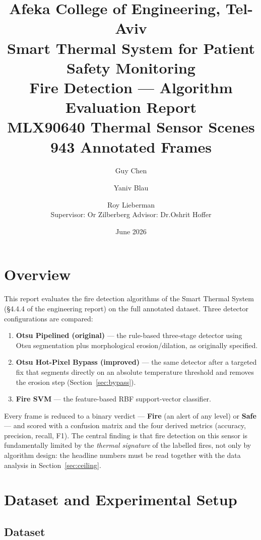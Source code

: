 \documentclass[11pt, a4paper]{article}
\title{%
    {\large Afeka College of Engineering, Tel-Aviv}\\[0.4em]
    {\large Smart Thermal System for Patient Safety Monitoring}\\[0.8em]
    {\LARGE\bfseries Fire Detection — Algorithm Evaluation Report}\\[0.4em]
    {\normalsize MLX90640 Thermal Sensor \quad 22 Scenes \quad
     5{,}943 Annotated Frames}
}
\author{%
    Guy Chen \and Yaniv Blau \and Roy Lieberman\\[0.3em]
    \small Supervisor: Or Zilberberg \qquad Advisor: Dr.\@ Oshrit Hoffer
}
\date{June 2026}
\begin{document}
\maketitle
\tableofcontents
\newpage

\section{Overview}

This report evaluates the fire detection algorithms of the Smart Thermal System
(\S4.4.4 of the engineering report) on the full annotated dataset.  Three detector
configurations are compared:

\begin{enumerate}[leftmargin=2em]
    \item \textbf{Otsu Pipelined (original)} — the rule-based three-stage detector
          using Otsu segmentation plus morphological erosion/dilation, as originally
          specified.
    \item \textbf{Otsu Hot-Pixel Bypass (improved)} — the same detector after a
          targeted fix that segments directly on an absolute temperature threshold and
          removes the erosion step (Section~\ref{sec:bypass}).
    \item \textbf{Fire SVM} — the feature-based RBF support-vector classifier.
\end{enumerate}

Every frame is reduced to a binary verdict — \textbf{Fire} (an alert of any level)
or \textbf{Safe} — and scored with a confusion matrix and the four derived metrics
(accuracy, precision, recall, F1).  The central finding is that fire detection on this
sensor is fundamentally limited by the \emph{thermal signature} of the labelled fires,
not only by algorithm design: the headline numbers must be read together with the
data analysis in Section~\ref{sec:ceiling}.

\section{Dataset and Experimental Setup}

\subsection{Dataset}
\end{document}
